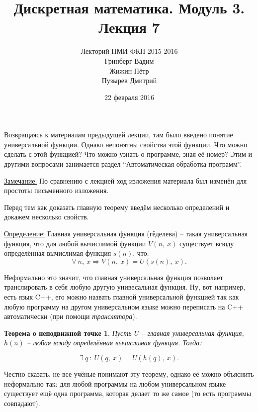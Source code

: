 \documentclass[a4paper, 12pt]{article}
\newtheorem*{point}{Теорема о неподвижной точке}
\newcommand{\definition}{\underline{Определение:} }
\newcommand{\note}{\underline{Замечание:} }
\begin{document}
\title{Дискретная математика. Модуль 3. Лекция 7}
\author{Лекторий ПМИ ФКН 2015-2016\\Гринберг Вадим\\Жижин Пётр\\Пузырев Дмитрий}
\date{22 февраля 2016}

\maketitle

Возвращаясь к материалам предыдущей лекции, там было введено понятие универсальной
функции. Однако непонятны свойства этой функции. Что можно сделать с этой
функцией? Что можно узнать о программе, зная её номер?
Этим и другими вопросами занимается раздел ``Автоматическая обработка программ''.

\note По сравнению с лекцией ход изложения материала был изменён для простоты
письменного изложения.

Перед тем как доказать главную теорему введём несколько определений и докажем несколько
свойств.

\definition{Главная универсальная функция (гёделева) -- такая универсальная функция, 
что для любой вычислимой функции $V(n,\ x)$ существует всюду определённая
вычислимая функция $s(n)$, что:
    \[
        \forall\ n,\ x \Rightarrow V(n,\ x) = U(s(n),\ x).
    \]
}

Неформально это значит, что главная универсальная функция позволяет транслировать
в себя любую другую унивесальная функция. Ну, вот например, есть язык C++, его можно
назвать главной универсальной функцией так как любую программу на другом универсальном
языке можно переписать на C++ автоматически (при помощи \emph{транслятора}).

\begin{point}
    Пусть $U$ -- главная универсальная функция, $h(n)$ -- любая всюду определённая вычислимая функция. Тогда:
    
    \[
        \exists\ q \ : \ U(q,\ x) = U(h(q),\ x).
    \]
\end{point}

Честно сказать, не все учёные понимают эту теорему, однако её можно объяснить неформально
так: для любой программы на любом универсальном языке существует ещё одна программа,
которая делает то же самое (то есть программы совпадают).
\end{document}

